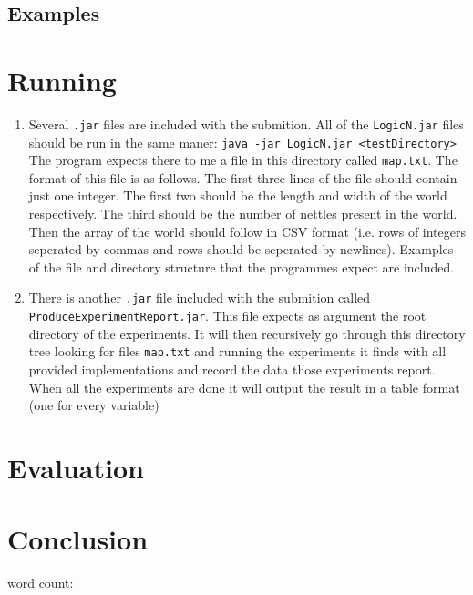 \documentclass[british]{article}
\newcommand{\code}[1]{\texttt{#1}}
\begin{document}
\subsection{Examples}
\label{example}

 
\section{Running}
\label{running}
\begin{enumerate}
\item  Several \code{.jar} files are included with the submition. All of the \code{LogicN.jar} files should be run in the same maner: \code{java -jar LogicN.jar <testDirectory>} The program expects there to me a file in this directory called \code{map.txt}. The format of this file is as follows. The first three lines of the file should contain just one integer. The first two should be the length and width of the world respectively. The third should be the number of nettles present in the world. Then the array of the world should follow in CSV format (i.e. rows of integers seperated by commas and rows should be seperated by newlines). Examples of the file and directory structure that the programmes expect are included.
\item There is another \code{.jar} file included with the submition called \code{ProduceExperimentReport.jar}. This file expects as argument the root directory of the experiments. It will then recursively go through this directory tree looking for files \code{map.txt}  and running the experiments it finds with all provided implementations and record the data those experiments report. When all the experiments are done it will output the result in a table format (one for every variable)   
\end{enumerate}
 
\section{Evaluation}
\label{evals}


\section{Conclusion}
\label{conclusion}

 
 
word count:
{}

\end{document}
